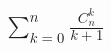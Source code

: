 \documentclass{article}
\newcommand{\ds}{\displaystyle}
\newcommand{\Cnk}[2]{C_{#1}^{#2}}
\renewcommand{\f}{\frac}
\begin{document}
  \subsection{$\ds \sum_{k=0}^n\f{\Cnk{n}{k}}{k+1}$}
\end{document}
